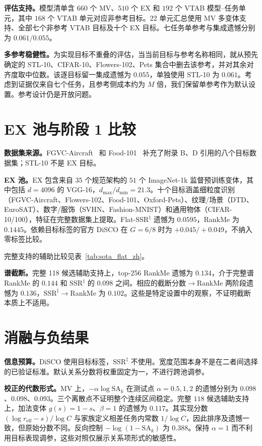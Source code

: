 \documentclass{article}
\newcommand{\reff}{\ensuremath{r_{\mathrm{eff}}}\xspace}
\newcommand{\SAk}{\ensuremath{\mathrm{SA}_k}\xspace}
\newcommand{\SSRdag}{\ensuremath{\mathrm{SSR}^{\ddagger}}\xspace}
\begin{document}
\textbf{评估支持。}模型清单含 $660$ 个 MV、$510$ 个 EX 和 $192$ 个 VTAB 模型--任务单元，其中 $168$ 个 VTAB 单元对应非参考目标。$22$ 单元汇总使用 MV 多变体支持、全部七个非参考 VTAB 目标及十个 EX 目标。七任务单参考与集成遗憾分别为 $0.061/0.055$。

\textbf{多参考稳健性。}为实现目标不重叠的评估，当当前目标与参考名称相同，就从预先确定的 STL-10、CIFAR-10、Flowers-102、Pets 集合中删去该参考，并对其余对齐度取中位数。该逐目标留一集成遗憾为 $0.055$，单独使用 STL-10 为 $0.061$。考虑到证据仅来自七个任务，且参考侧成本约为 $M$ 倍，我们保留单参考作为默认设置。参考设计仍是开放问题。

\section{EX 池与阶段 1 比较}
\textbf{数据集来源。}FGVC-Aircraft~\citep{maji2013aircraft} 和 Food-101~\citep{bossard2014food} 补充了附录 B、D 引用的八个目标数据集；STL-10 不是 EX 目标。

\textbf{EX 池。}EX 包含来自 $35$ 个规范架构的 $51$ 个 ImageNet-1k 监督预训练变体，其中包括 $d=4096$ 的 VGG-16，$d_{\max}/d_{\min}=21.3$。十个目标涵盖细粒度识别（FGVC-Aircraft、Flowers-102、Food-101、Oxford-Pets）、纹理/场景（DTD、EuroSAT）、数字/服饰（SVHN、Fashion-MNIST）和通用物体（CIFAR-10/100），特征在完整数据集上提取。Flat-\SSRdag 遗憾为 $0.0595$，RankMe 为 $0.1445$。依赖目标标签的官方 DiSCO 在 $G=6/8$ 时为 $+0.045/+0.049$，不纳入零标签比较。

完整支持的辅助比较见表~\ref{tab:sota_flat_zh}。

\textbf{谱截断。}完整 118 候选辅助支持上，top-256 RankMe 遗憾为 $0.134$，介于完整谱 RankMe 的 $0.144$ 和 \SSRdag 的 $0.098$ 之间。相应的截断分数$\to$RankMe 两阶段遗憾为 $0.136$，\SSRdag$\to$RankMe 为 $0.102$。这些是特定设置中的观察，不证明截断本质上不适用。

\section{消融与负结果}
\textbf{信息预算。}DiSCO 使用目标标签，\SSRdag 不使用。宽度范围本身不是在二者间选择的已验证标准。默认关系分数将权重固定为一，不进行跨池调参。

\textbf{校正的代数形式。}MV 上，$-\alpha\log\SAk$ 在测试点 $\alpha=0.5,1,2$ 的遗憾分别为 $0.098$、$0.098$、$0.093$。三个离散点不证明整个连续区间稳定。完整 $118$ 候选辅助支持上，加法变体 $g(s)=1-s$、$\beta=1$ 的遗憾为 $0.117$。其实现分数 $(\log\reff-s)/\log C$ 与家族定义相差任务内常数 $1/\log C$，因此排序及遗憾一致，但原始分数不同。反向控制 $-\log(1-\SAk)$ 为 $0.388$。保持 $\alpha=1$ 而不利用目标表现调参，这些对照仅展示关系项形式的敏感性。
\end{document}
